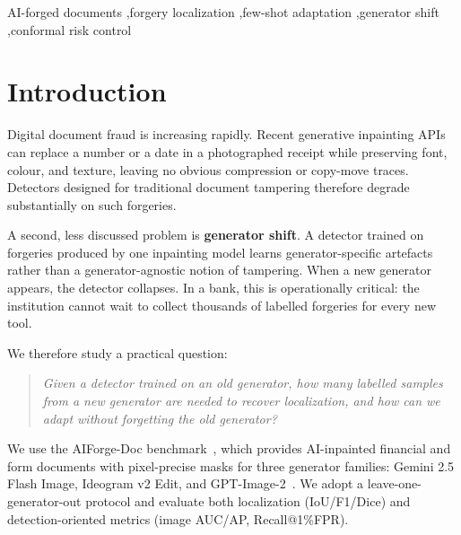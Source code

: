 \documentclass[preprint,12pt]{elsarticle}
\begin{document}
\begin{frontmatter}
\begin{abstract}
\textbf{15.5\% at 5.5\% pixel false alarms} because the selected window misses part of the annotation in about 15\% of documents. Conformal risk control therefore gives a one-sided guarantee on misses, not a usable operating point: image triage remains the deployment bottleneck. We release code, splits, and all results for reproducibility.
\end{abstract}
\begin{keyword}
AI-forged documents \sep forgery localization \sep few-shot adaptation \sep generator shift \sep conformal risk control
\end{keyword}
\end{frontmatter}

\section{Introduction}\label{introduction}

Digital document fraud is increasing rapidly. Recent generative inpainting APIs can replace a number or a date in a photographed receipt while preserving font, colour, and texture, leaving no obvious compression or copy-move traces. Detectors designed for traditional document tampering therefore degrade substantially on such forgeries.

A second, less discussed problem is \textbf{generator shift}. A detector trained on forgeries produced by one inpainting model learns generator-specific artefacts rather than a generator-agnostic notion of tampering. When a new generator appears, the detector collapses. In a bank, this is operationally critical: the institution cannot wait to collect thousands of labelled forgeries for every new tool.

We therefore study a practical question:

\begin{quote}
\emph{Given a detector trained on an old generator, how many labelled samples from a new generator are needed to recover localization, and how can we adapt without forgetting the old generator?}
\end{quote}

We use the AIForge-Doc benchmark~\cite{wu2026aiforgedoc}, which provides AI-inpainted financial and form documents with pixel-precise masks for three generator families: Gemini 2.5 Flash Image, Ideogram v2 Edit, and GPT-Image-2~\cite{wu2026forgerjudge}. We adopt a leave-one-generator-out protocol and evaluate both localization (IoU/F1/Dice) and detection-oriented metrics (image AUC/AP, Recall@1\%FPR).
\end{document}
